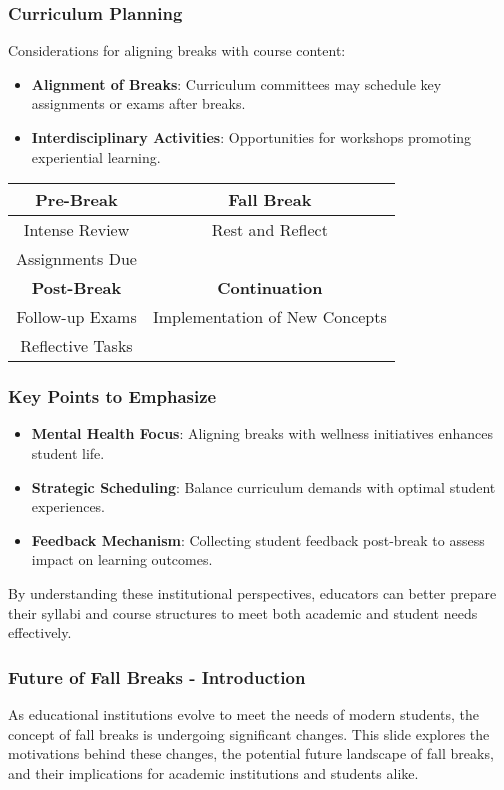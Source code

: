 \documentclass[aspectratio=169]{beamer}
\begin{document}
\begin{frame}[fragile]
    \frametitle{Curriculum Planning}
    Considerations for aligning breaks with course content:

    \begin{itemize}
        \item \textbf{Alignment of Breaks}: Curriculum committees may schedule key assignments or exams after breaks.
        \item \textbf{Interdisciplinary Activities}: Opportunities for workshops promoting experiential learning.
    \end{itemize}

    \begin{center}
    \begin{tabular}{|c|c|}
    \hline
    \textbf{Pre-Break} & \textbf{Fall Break} \\ \hline
    Intense Review & Rest and Reflect \\ 
    Assignments Due &  \\ \hline
    \textbf{Post-Break} & \textbf{Continuation} \\ \hline
    Follow-up Exams & Implementation of New Concepts \\ 
    Reflective Tasks &  \\ \hline
    \end{tabular}
    \end{center}
\end{frame}

\begin{frame}[fragile]
    \frametitle{Key Points to Emphasize}
    \begin{itemize}
        \item \textbf{Mental Health Focus}: Aligning breaks with wellness initiatives enhances student life.
        \item \textbf{Strategic Scheduling}: Balance curriculum demands with optimal student experiences.
        \item \textbf{Feedback Mechanism}: Collecting student feedback post-break to assess impact on learning outcomes.
    \end{itemize}

    By understanding these institutional perspectives, educators can better prepare their syllabi and course structures to meet both academic and student needs effectively.
\end{frame}

\begin{frame}[fragile]
    \frametitle{Future of Fall Breaks - Introduction}
    As educational institutions evolve to meet the needs of modern students, the concept of fall breaks is undergoing significant changes. 
    This slide explores the motivations behind these changes, the potential future landscape of fall breaks, and their implications for academic institutions and students alike.
\end{frame}
\end{document}
